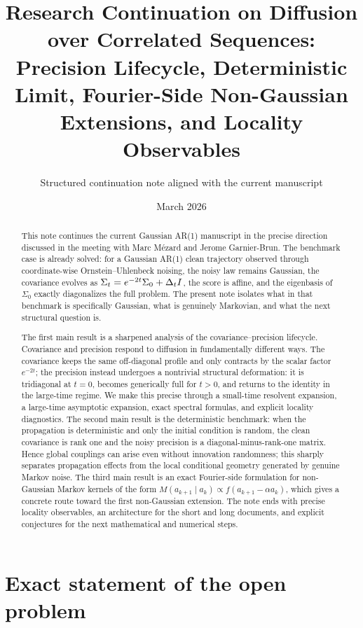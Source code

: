 \documentclass[11pt]{article}
\title{\textbf{Research Continuation on Diffusion over Correlated Sequences:}\\
Precision Lifecycle, Deterministic Limit, Fourier-Side Non-Gaussian Extensions, and Locality Observables}
\author{Structured continuation note aligned with the current manuscript}
\date{March 2026}
\begin{document}
\maketitle
\thispagestyle{empty}

\begin{abstract}
This note continues the current Gaussian AR(1) manuscript in the precise direction discussed in the meeting with Marc M\'ezard and Jerome Garnier-Brun. The benchmark case is already solved: for a Gaussian AR(1) clean trajectory observed through coordinate-wise Ornstein--Uhlenbeck noising, the noisy law remains Gaussian, the covariance evolves as $\Sigma_t=e^{-2t}\Sigma_0+\Delta_tI$, the score is affine, and the eigenbasis of $\Sigma_0$ exactly diagonalizes the full problem. The present note isolates what in that benchmark is specifically Gaussian, what is genuinely Markovian, and what the next structural question is.

The first main result is a sharpened analysis of the covariance--precision lifecycle. Covariance and precision respond to diffusion in fundamentally different ways. The covariance keeps the same off-diagonal profile and only contracts by the scalar factor $e^{-2t}$; the precision instead undergoes a nontrivial structural deformation: it is tridiagonal at $t=0$, becomes generically full for $t>0$, and returns to the identity in the large-time regime. We make this precise through a small-time resolvent expansion, a large-time asymptotic expansion, exact spectral formulas, and explicit locality diagnostics. The second main result is the deterministic benchmark: when the propagation is deterministic and only the initial condition is random, the clean covariance is rank one and the noisy precision is a diagonal-minus-rank-one matrix. Hence global couplings can arise even without innovation randomness; this sharply separates propagation effects from the local conditional geometry generated by genuine Markov noise. The third main result is an exact Fourier-side formulation for non-Gaussian Markov kernels of the form $M(a_{k+1}\mid a_k)\propto f(a_{k+1}-\alpha a_k)$, which gives a concrete route toward the first non-Gaussian extension. The note ends with precise locality observables, an architecture for the short and long documents, and explicit conjectures for the next mathematical and numerical steps.
\end{abstract}

\newpage
\tableofcontents
\newpage

\section{Exact statement of the open problem}
\end{document}
